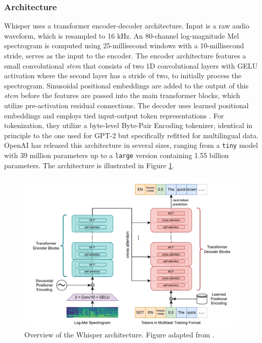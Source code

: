 \subsubsection{Architecture}
Whisper uses a transformer encoder-decoder architecture. Input is a raw audio waveform, which is resampled to 16 kHz. An 80-channel log-magnitude Mel spectrogram is computed using 25-millisecond windows with a 10-millisecond stride, serves as the input to the encoder. The encoder architecture features a small convolutional \textit{stem} that consists of two 1D convolutional layers with GELU activation \cite{hendrycks2016gaussian} where the second layer has a stride of two, to initially process the spectrogram. Sinusoidal positional embeddings are added to the output of this \textit{stem} before the features are passed into the main transformer blocks, which utilize pre-activation residual connections. The decoder uses learned positional embeddings and employs tied input-output token representations \cite{Press_2017}. For tokenization, they utilize a byte-level Byte-Pair Encoding tokenizer, identical in principle to the one used for GPT-2 but specifically refitted for multilingual data. OpenAI has released this architecture in several sizes, ranging from a \texttt{tiny} model with 39 million parameters up to a \texttt{large} version containing 1.55 billion parameters. The architecture is illustrated in Figure \ref{fig:whisper_format}.


\begin{figure}[h!]
    \centering
    \includegraphics[width=1\textwidth]{obrazky-figures/whisper_arch.png} 
    \caption{Overview of the Whisper architecture. Figure adapted from \cite{radford2022robust}.}
    \label{fig:whisper_format}
\end{figure}

